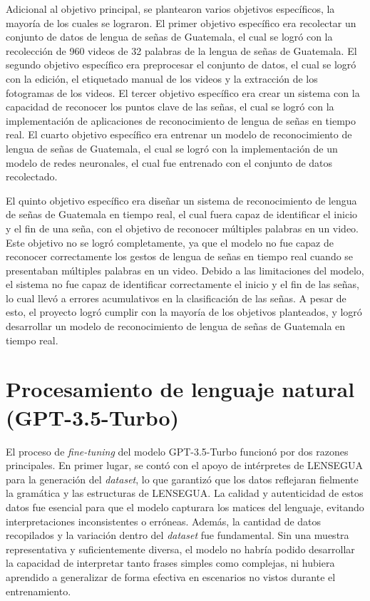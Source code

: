 Adicional al objetivo principal, se plantearon varios objetivos específicos, la mayoría de los cuales se lograron.
El primer objetivo específico era recolectar un conjunto de datos de lengua de señas de Guatemala, el cual se logró con la recolección de 960 videos de 32 palabras de la lengua de señas de Guatemala.
El segundo objetivo específico era preprocesar el conjunto de datos, el cual se logró con la edición, el etiquetado manual de los videos y la extracción de los fotogramas de los videos.
El tercer objetivo específico era crear un sistema con la capacidad de reconocer los puntos clave de las señas, el cual se logró con la implementación de aplicaciones de reconocimiento de lengua de señas en tiempo real.
El cuarto objetivo específico era entrenar un modelo de reconocimiento de lengua de señas de Guatemala, el cual se logró con la implementación de un modelo de redes neuronales, el cual fue entrenado con el conjunto de datos recolectado.

El quinto objetivo específico era diseñar un sistema de reconocimiento de lengua de señas de Guatemala en tiempo real, el cual fuera capaz de identificar el inicio y el fin de una seña, con el objetivo de reconocer múltiples palabras en un video.
Este objetivo no se logró completamente, ya que el modelo no fue capaz de reconocer correctamente los gestos de lengua de señas en tiempo real cuando se presentaban múltiples palabras en un video.
Debido a las limitaciones del modelo, el sistema no fue capaz de identificar correctamente el inicio y el fin de las señas, lo cual llevó a errores acumulativos en la clasificación de las señas.
A pesar de esto, el proyecto logró cumplir con la mayoría de los objetivos planteados, y logró desarrollar un modelo de reconocimiento de lengua de señas de Guatemala en tiempo real.


\section{Procesamiento de lenguaje natural (GPT-3.5-Turbo)} 

El proceso de \textit{fine-tuning} del modelo GPT-3.5-Turbo funcionó por dos razones principales. En primer lugar, se contó con el apoyo de intérpretes de LENSEGUA para la generación del \textit{dataset}, lo que garantizó que los datos reflejaran fielmente la gramática y las estructuras de LENSEGUA. La calidad y autenticidad de estos datos fue esencial para que el modelo capturara los matices del lenguaje, evitando interpretaciones inconsistentes o erróneas. Además, la cantidad de datos recopilados y la variación dentro del \textit{dataset} fue fundamental. Sin una muestra representativa y suficientemente diversa, el modelo no habría podido desarrollar la capacidad de interpretar tanto frases simples como complejas, ni hubiera aprendido a generalizar de forma efectiva en escenarios no vistos durante el entrenamiento.

